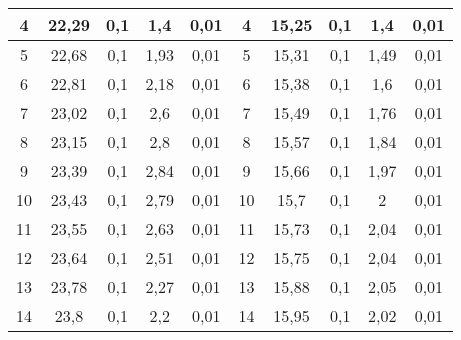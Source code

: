 \documentclass[a4paper,12pt]{extreport}
\begin{document}
\begin{enumerate}
\begin{table}[h]
\begin{tabular}{ccccc||c|c|c|c|c|}
\multicolumn{1}{|c|}{4}   & \multicolumn{1}{c|}{22,29}     & \multicolumn{1}{c|}{0,1}             & \multicolumn{1}{c|}{1,4}   & 0,01                  & 4   & 15,25   & 0,1             & 1,4 & 0,01          \\ \hline
\multicolumn{1}{|c|}{5}   & \multicolumn{1}{c|}{22,68}       & \multicolumn{1}{c|}{0,1}             & \multicolumn{1}{c|}{1,93}   & 0,01                  & 5   & 15,31     & 0,1             & 1,49 & 0,01          \\ \hline
\multicolumn{1}{|c|}{6}   & \multicolumn{1}{c|}{22,81}     & \multicolumn{1}{c|}{0,1}             & \multicolumn{1}{c|}{2,18}   & 0,01                  & 6   & 15,38   & 0,1             & 1,6 & 0,01          \\ \hline
\multicolumn{1}{|c|}{7}   & \multicolumn{1}{c|}{23,02}     & \multicolumn{1}{c|}{0,1}             & \multicolumn{1}{c|}{2,6}   & 0,01                  & 7   & 15,49   & 0,1             & 1,76 & 0,01          \\ \hline
\multicolumn{1}{|c|}{8}   & \multicolumn{1}{c|}{23,15}     & \multicolumn{1}{c|}{0,1}             & \multicolumn{1}{c|}{2,8}   & 0,01                  & 8   & 15,57   & 0,1             & 1,84 & 0,01          \\ \hline
\multicolumn{1}{|c|}{9}   & \multicolumn{1}{c|}{23,39}     & \multicolumn{1}{c|}{0,1}             & \multicolumn{1}{c|}{2,84}   & 0,01                  & 9   & 15,66     & 0,1             & 1,97  & 0,01          \\ \hline
\multicolumn{1}{|c|}{10}  & \multicolumn{1}{c|}{23,43}     & \multicolumn{1}{c|}{0,1}             & \multicolumn{1}{c|}{2,79}   & 0,01                  & 10  & 15,7   & 0,1             & 2 & 0,01          \\ \hline
\multicolumn{1}{|c|}{11}  & \multicolumn{1}{c|}{23,55}     & \multicolumn{1}{c|}{0,1}             & \multicolumn{1}{c|}{2,63}   & 0,01                  & 11  & 15,73   & 0,1             & 2,04 & 0,01          \\ \hline
\multicolumn{1}{|c|}{12}  & \multicolumn{1}{c|}{23,64}     & \multicolumn{1}{c|}{0,1}             & \multicolumn{1}{c|}{2,51}   & 0,01                  & 12  & 15,75   & 0,1             & 2,04  & 0,01          \\ \hline
\multicolumn{1}{|c|}{13}  & \multicolumn{1}{c|}{23,78}       & \multicolumn{1}{c|}{0,1}           & \multicolumn{1}{c|}{2,27}   & 0,01                  & 13  & 15,88   & 0,1             & 2,05 & 0,01          \\ \hline
\multicolumn{1}{|c|}{14}  & \multicolumn{1}{c|}{23,8}     & \multicolumn{1}{c|}{0,1}             & \multicolumn{1}{c|}{2,2}   & 0,01                  & 14  & 15,95   & 0,1             & 2,02 & 0,01          \\ \hline

\end{tabular}
\end{table}
\end{enumerate}
\end{document}
